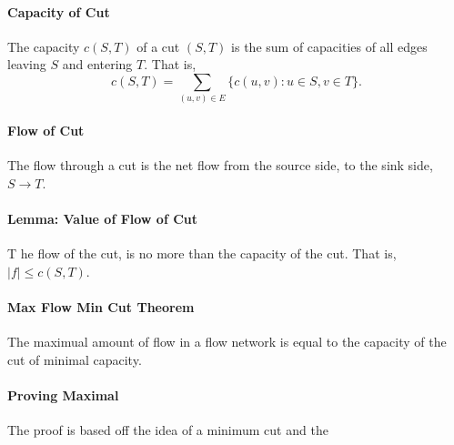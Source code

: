 \paragraph{Capacity of Cut}
The capacity \( c(S, T) \) of a cut  \( (S, T) \)
is the sum of capacities of all edges leaving  \( S \) and entering \( T \).
That is, \[
    c(S, T) = \sum_{(u, v) \in  E} \{ c(u, v) : u \in S, v \in T \} 
.\]


\paragraph{Flow of Cut}
The flow through a cut is the net flow from the source side, to the sink side,
\( S \to  T \).

\paragraph{Lemma: Value of Flow of Cut}
T he flow of the cut, is no more than the capacity of the cut.
That is, \( |f| \leq c(S, T) \).

\paragraph{Max Flow Min Cut Theorem}
The maximual amount of flow in a flow network is equal to the capacity of the
cut of minimal capacity.


\paragraph{Proving Maximal}
The proof is based off the idea of a minimum cut and the 




